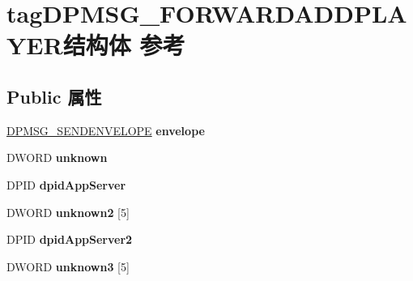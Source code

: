 \hypertarget{structtag_d_p_m_s_g___f_o_r_w_a_r_d_a_d_d_p_l_a_y_e_r}{}\section{tag\+D\+P\+M\+S\+G\+\_\+\+F\+O\+R\+W\+A\+R\+D\+A\+D\+D\+P\+L\+A\+Y\+E\+R结构体 参考}
\label{structtag_d_p_m_s_g___f_o_r_w_a_r_d_a_d_d_p_l_a_y_e_r}
\subsection*{Public 属性}
\begin{DoxyCompactItemize}
\item 
\mbox{\label{structtag_d_p_m_s_g___f_o_r_w_a_r_d_a_d_d_p_l_a_y_e_r_aa4128704fb8ad2c8a99085cf6a234b1c}} 
\hyperlink{structtag_d_p_m_s_g___s_e_n_d_e_n_v_e_l_o_p_e}{D\+P\+M\+S\+G\+\_\+\+S\+E\+N\+D\+E\+N\+V\+E\+L\+O\+PE} {\bfseries envelope}
\item 
\mbox{\label{structtag_d_p_m_s_g___f_o_r_w_a_r_d_a_d_d_p_l_a_y_e_r_a8bc9cea69891d08a3a7b4475ca533196}} 
D\+W\+O\+RD {\bfseries unknown}
\item 
\mbox{\label{structtag_d_p_m_s_g___f_o_r_w_a_r_d_a_d_d_p_l_a_y_e_r_ac0c8a98fd335ead2bc83f2d6c65c978f}} 
D\+P\+ID {\bfseries dpid\+App\+Server}
\item 
\mbox{\label{structtag_d_p_m_s_g___f_o_r_w_a_r_d_a_d_d_p_l_a_y_e_r_a0312db77e5fa3b5d5d67608d6f16db5f}} 
D\+W\+O\+RD {\bfseries unknown2} \mbox{[}5\mbox{]}
\item 
\mbox{\label{structtag_d_p_m_s_g___f_o_r_w_a_r_d_a_d_d_p_l_a_y_e_r_a789a25ad8418e1d1958726c9f581b8e5}} 
D\+P\+ID {\bfseries dpid\+App\+Server2}
\item 
\mbox{\label{structtag_d_p_m_s_g___f_o_r_w_a_r_d_a_d_d_p_l_a_y_e_r_a44cce12504d6b7368e9cf129c81ec0a1}} 
D\+W\+O\+RD {\bfseries unknown3} \mbox{[}5\mbox{]}

\end{DoxyCompactItemize}
